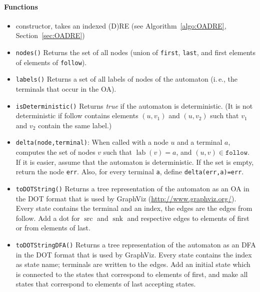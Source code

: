 \documentclass[a4paper,11pt, svgnames,titlepage]{article}
\DeclareMathOperator{\lab}{lab}
\DeclareMathOperator{\src}{src}
\DeclareMathOperator{\snk}{snk}
\begin{document}
\paragraph{Functions}
\begin{itemize}
	\item constructor, takes an indexed (D)RE (see Algorithm~\ref{algo:OADRE}, Section~\ref{sec:OADRE})
	\item\texttt{nodes()} Returns the set of all nodes (union of \texttt{first}, \texttt{last}, and first elements of elements of \texttt{follow}). 
	\item\texttt{labels()} Returns a set of all labels of nodes of the automaton (i.\,e., the terminals that occur in the OA).
	\item\texttt{isDeterministic()} Returns \emph{true} if the automaton is deterministic. (It is not deterministic if follow contains elements $(u,v_1)$ and $(u,v_2)$ such that $v_1$ and $v_2$ contain the same label.)
	\item\texttt{delta(node,terminal)}: When called with a node $u$ and a terminal $a$, computes the set of nodes $v$ such that $\lab(v)=a$, and $(u,v)\in\mathtt{follow}$. If it is easier, assume that the automaton is deterministic. If the set is empty, return the node \texttt{err}. Also, for every terminal \texttt{a}, define \texttt{delta(err,a)=err}.
	\item\texttt{toDOTString()} Returns a tree representation of the automaton as an OA in the DOT format that is used by GraphViz  (\url{http://www.graphviz.org/}). Every state contains the terminal and an index, the edges are the edges from follow. Add a dot for $\src$ and $\snk$ and respective edges to elements of first or from elements of last.
	\item\texttt{toDOTStringDFA()} Returns a tree representation of the automaton as an DFA in the DOT format that is used by GraphViz. Every state contains the index as state name; terminals are written to the edges. Add an initial state which is connected to the states that correspond to elements of first, and make all states that correspond to elements of last accepting states.
\end{itemize}
\newpage
\end{document}
